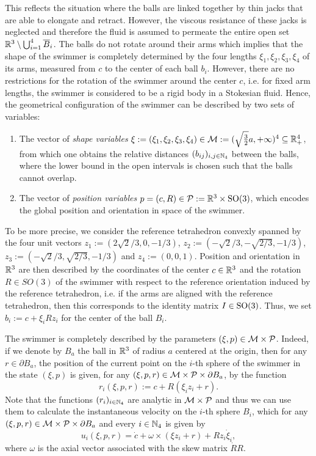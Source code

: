  This reflects the situation where the balls are linked together by thin jacks that are able to elongate and retract. However, the viscous resistance of these jacks is neglected and therefore the fluid is assumed to permeate the entire open set $\mathbb{R}^3 \setminus \bigcup_{i = 1}^{4} \overline{B}_i$. The balls do not rotate around their arms which implies that the shape of the swimmer is completely determined by the four lengths $\xi_1, \xi_2, \xi_3, \xi_4$ of its arms, measured from $c$ to the center of each ball $b_i$. However, there are no restrictions for the rotation of the swimmer around the center $c$, i.e. for fixed arm lengths, the swimmer is considered to be a rigid body in a Stokesian fluid.
Hence, the geometrical configuration of the swimmer can be described by two sets of variables:
\begin{enumerate}
	\item The vector of \emph{shape variables} $\xi := (\xi_1, \xi_2, \xi_3, \xi_4) \in \mathcal{M} := (\sqrt{\tfrac{3}{2}}a, +\infty)^4 \subseteq \mathbb{R}_+^4$, from which one obtains the relative distances $(b_{ij})_{i,j \in \mathbb{N}_4}$ between the balls,  where the lower bound in the open intervals is chosen such that the balls cannot overlap.
	\item The vector of \emph{position variables} $p = (c, R) \in \mathcal{P} :=  \mathbb{R}^3 \times \operatorname{SO}(3)$, which encodes the global position and orientation in space of the swimmer.
\end{enumerate}
To be more precise, we consider the reference tetrahedron convexly spanned by the four unit vectors $z_1 := (2 \sqrt{2}/3,0,-1/3)$, $z_2 := (-\sqrt{2}/3,-\sqrt{2/3},-1/3)$, $z_3 := (-\sqrt{2}/3,\sqrt{2/3},-1/3)$ and $z_4 := (0,0,1)$. Position and orientation in $\mathbb{R}^3$ are then described by the coordinates of the center $c \in \mathbb{R}^3$ and the rotation $R \in SO(3)$ of the swimmer with respect to the reference orientation induced by the reference tetrahedron, i.e. if the arms are aligned with the reference tetrahedron, then this corresponds to the identity matrix $I \in \operatorname{SO}(3)$. Thus, we set $b_i := c + \xi_i R z_i$ for the center of the ball $B_i$.

The swimmer is completely described by the parameters $(\xi, p) \in \mathcal{M} \times \mathcal{P}$. Indeed, if we denote by $B_a$ the ball in $\mathbb{R}^3$ of radius $a$ centered at the origin, then for any $r \in \partial B_a$, the position of the current point on the $i$-th sphere of the swimmer in the state $(\xi, p)$ is given, for any $(\xi, p, r) \in \mathcal{M} \times \mathcal{P} \times \partial B_a$, by the function
\begin{equation}
	r_i(\xi, p, r) :=  c + R(\xi_i z_i + r).
\end{equation}
Note that the functions $(r_i)_{i \in \mathbb{N}_4}$ are analytic in $\mathcal{M}  \times \mathcal{P}$ and thus we can use them to calculate the instantaneous velocity on the $i$-th sphere $B_i$, which for any $(\xi, p, r) \in \mathcal{M} \times \mathcal{P} \times \partial B_a$ and every $i \in \mathbb{N}_4$ is given by
\begin{equation}
	u_i(\xi, p, r) = \dot{c} + \omega \times (\xi z_i + r) + R z_i \dot{\xi}_i,
\end{equation}
where $\omega$ is the axial vector associated with the skew matrix $\dot{R} R$.

